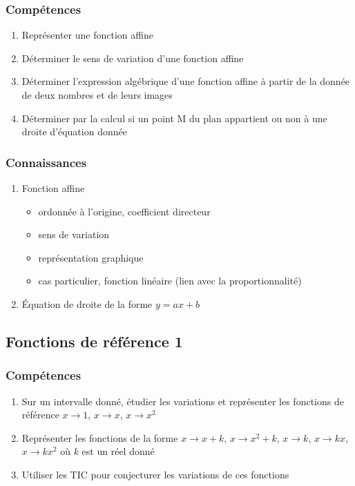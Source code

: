 \documentclass[12pt,a4paper]{article}
\begin{document}
	\subsubsection*{Compétences}
	\begin{enumerate}
		\item Représenter une fonction affine
		\item Déterminer le sens de variation d'une fonction affine
		\item Déterminer l'expression algébrique d'une fonction affine à partir de la donnée de deux nombres et de leurs images
		\item Déterminer par la calcul si un point M du plan appartient ou non à une droite d'équation donnée
	\end{enumerate}
	
	\subsubsection*{Connaissances}
	
	\begin{enumerate}
		
		\item Fonction affine
		\begin{itemize}
			\item ordonnée à l'origine, coefficient directeur
			\item sens de variation
			\item représentation graphique
			\item cas particulier, fonction linéaire (lien avec la proportionnalité)
			
		\end{itemize}
		\item \'Equation de droite de la forme $y=ax+b$
	\end{enumerate}

\subsection{Fonctions de référence 1}
	\subsubsection*{Compétences}
	\begin{enumerate}
		\item Sur un intervalle donné, étudier les variations et représenter les fonctions de référence $x \rightarrow 1$, $x \rightarrow x$, $x \rightarrow x^2$
		\item Représenter les fonctions de la forme $x \rightarrow x+k$, $x \rightarrow x^2+k$, $x \rightarrow k$, $x \rightarrow kx$, $x \rightarrow kx^2$ où $k$ est un réel donné
		\item Utiliser les TIC pour conjecturer les variations de ces fonctions
	\end{enumerate}
	
\end{document}
